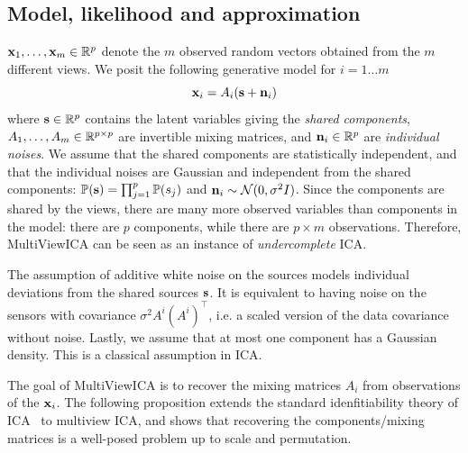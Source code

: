 \documentclass[12pt]{report}
\begin{document}
\subsection{Model, likelihood and approximation}
$\mathbf{x}_1, \dots ,\mathbf{x}_m \in \mathbb{R}^p$ denote the $m$ observed random vectors obtained from the $m$ different views. We posit the following generative model for $i= 1\dots m$
\begin{equation}
  \label{eq:multiviewica}
   \mathbf{x}_i = A_i(\mathbf{s} + \mathbf{n}_i)
\end{equation}
where $\mathbf{s} \in \mathbb{R}^{p}$ contains the latent variables giving the \emph{shared components}, $A_1,\dots, A_m\in\mathbb{R}^{p\times p}$ are invertible mixing matrices, and $\mathbf{n}_i \in
\mathbb{R}^{p}$ are \emph{individual noises}.
We assume that the shared components are statistically independent, and that the individual noises are Gaussian and independent from the shared components:
$\mathbb{P}(\mathbf{s}) = \prod_{j=1}^p \mathbb{P}(s_j)$ and $\mathbf{n}_i \sim\mathcal{N}(0, \sigma^2 I)$. 
Since the components are shared by the views, there are many more observed variables than components in the model: there are $p$ components, while there are $p \times m$ observations.
Therefore, MultiViewICA can be seen as an instance of \emph{undercomplete} ICA.
%

The assumption of additive white noise on the sources models individual deviations from the shared sources $\mathbf{s}$.
It is equivalent to having noise on the sensors with covariance $\sigma^2 A^i \left(A^i\right)^{\top}$, i.e. a scaled version of the data covariance without noise.
Lastly, we assume that at most one component has a Gaussian density. This is a classical assumption in ICA.

The goal of MultiViewICA is to recover the mixing matrices $A_i$ from observations of the $\mathbf{x}_i$.
%
The following proposition extends the standard idenfitiability theory of ICA~\cite{comon1994independent} to multiview ICA, and shows that recovering the components/mixing matrices is a well-posed problem up to scale and permutation.
\end{document}
